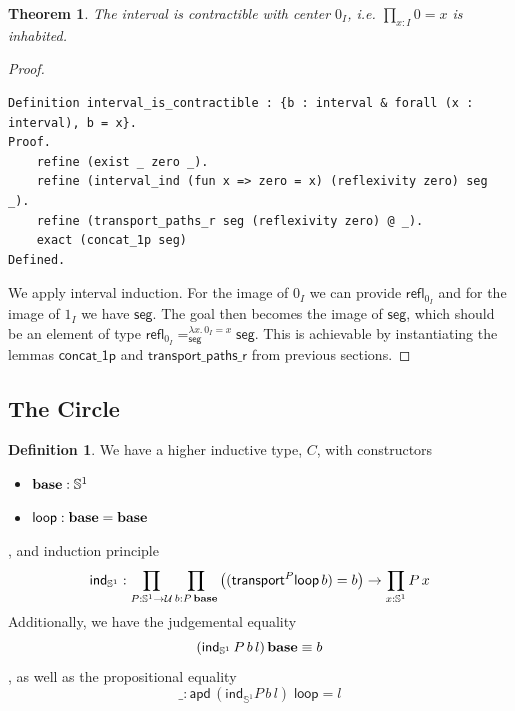 \documentclass[12 pt]{amsart}
\newtheorem{theorem}[subsubsection]{Theorem}
\theoremstyle{definition}
\newtheorem{definition}[subsubsection]{Definition}
\theoremstyle{remark}
\newcommand{\Type}{\mathcal{U}}
\newcommand{\base}{\mathsf{\bf base}}
\newcommand{\C}{{\mathbb{S}^1}}
\newcommand{\lo}{\mathsf{ loop}}
\newcommand{\trans}{\mathsf{transport}}
\newcommand{\apd}{\mathsf{apd}}
\newcommand{\refl}{\mathsf{refl}}
\newcommand{\seg}{{\mathsf{ seg}}}
\newcommand{\transportpathsr}{\mathsf{transport\_paths\_r}}
\newcommand{\concatonep}{\mathsf{concat\_1p}}
\begin{document}

\begin{theorem}
The interval is contractible with center $0_I$, i.e. $\prod_{x : I} 0 = x$ is inhabited.
\end{theorem}

\begin{proof}
\begin{lstlisting}
Definition interval_is_contractible : {b : interval & forall (x : interval), b = x}.
Proof.
    refine (exist _ zero _).
    refine (interval_ind (fun x => zero = x) (reflexivity zero) seg _).
    refine (transport_paths_r seg (reflexivity zero) @ _).
    exact (concat_1p seg)
Defined.
\end{lstlisting}

We apply interval induction. For the image of $0_I$ we can provide $\refl_{0_I}$ and for the image of $1_I$ we have $\seg$. The goal then becomes the image of $\seg$, which should be an element of type $\refl_{0_I} =^{\lambda x.\, 0_I = x}_\seg \seg$. This is achievable by instantiating the lemmas $\concatonep$ and $\transportpathsr$ from previous sections.
\end{proof}

\subsection{The Circle}
\label{subsec:circle}

\begin{definition}
We have a higher inductive type, $C$, with constructors
\begin{itemize}
\item $\base : \C$
\item $\lo : \base = \base$
\end{itemize}
, and induction principle
\[ \mathsf{ind}_{\C} :  \prod_{P : \C \to \Type} \prod_{b : P\,\base} \left((\trans^P \lo \,b) = b \right)\to \prod_
{x : \C} P\,x\]
Additionally, we have the judgemental equality
\[(\mathsf{ind}_{\C}\, P \, b \, l )\, \base \equiv b\]
, as well as the propositional equality
\[\_ : \apd \,(\mathsf{ind}_\C P \, b \, l)\; \lo = l\]
\end{definition}
\end{document}
